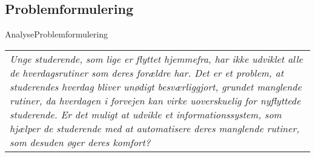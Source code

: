 \subsection{Problemformulering}
\begin{frame}{Analyse}{Problemformulering}
\begin{center}
\begin{tabular}{|p{9cm}|}
\textit{Unge studerende, som lige er flyttet hjemmefra, har ikke udviklet alle de hverdagsrutiner som deres forældre har. Det er et problem, at studerendes hverdag bliver unødigt besværliggjort, grundet manglende rutiner, da hverdagen i forvejen kan virke uoverskuelig for nyflyttede studerende. Er det muligt at udvikle et informationssystem, som hjælper de studerende med at automatisere deres manglende rutiner, som desuden øger deres komfort?}
\end{tabular}
\end{center}
\end{frame}